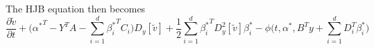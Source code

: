 The HJB equation then becomes
\begin{equation}
    \frac{\partial \tilde{v}}{\partial t} + \bigg({\alpha^\ast}^T - Y^T A - \sum_{i=1}^d {\beta_i^\ast}^T C_i\bigg)D_y[\tilde{v}] + \frac12 \sum_{i=1}^d {\beta_i^\ast}^T D_y^2[\tilde{v}] {\beta_i^\ast} - \phi\bigg(t, \alpha^\ast, B^T y + \sum_{i=1}^d D_i^T \beta_i^\ast \bigg) \label{eq: dual_hjb}
\end{equation}

